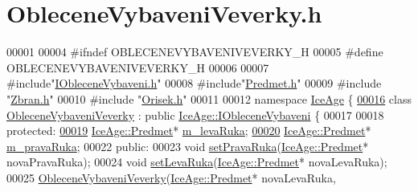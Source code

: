 \hypertarget{ObleceneVybaveniVeverky_8h_source}{}\section{Oblecene\+Vybaveni\+Veverky.\+h}
\label{ObleceneVybaveniVeverky_8h_source}

\begin{DoxyCode}
00001 
00004 \textcolor{preprocessor}{#ifndef OBLECENEVYBAVENIVEVERKY\_H}
00005 \textcolor{preprocessor}{#define OBLECENEVYBAVENIVEVERKY\_H}
00006 
00007 \textcolor{preprocessor}{#include"\hyperlink{IObleceneVybaveni_8h}{IObleceneVybaveni.h}"}
00008 \textcolor{preprocessor}{#include"\hyperlink{Predmet_8h}{Predmet.h}"}
00009 \textcolor{preprocessor}{#include "\hyperlink{Zbran_8h}{Zbran.h}"}
00010 \textcolor{preprocessor}{#include "\hyperlink{Orisek_8h}{Orisek.h}"}
00011 
00012 \textcolor{keyword}{namespace }\hyperlink{namespaceIceAge}{IceAge} \{
\hypertarget{ObleceneVybaveniVeverky_8h_source.tex_l00016}{}\hyperlink{classIceAge_1_1ObleceneVybaveniVeverky}{00016}     \textcolor{keyword}{class }\hyperlink{classIceAge_1_1ObleceneVybaveniVeverky}{ObleceneVybaveniVeverky} : \textcolor{keyword}{public} 
      \hyperlink{classIceAge_1_1IObleceneVybaveni}{IceAge::IObleceneVybaveni} \{
00017 
00018     \textcolor{keyword}{protected}:
\hypertarget{ObleceneVybaveniVeverky_8h_source.tex_l00019}{}\hyperlink{classIceAge_1_1ObleceneVybaveniVeverky_ad4e876f5b31bad5594470ee0c3588194}{00019}         \hyperlink{classIceAge_1_1Predmet}{IceAge::Predmet}* \hyperlink{classIceAge_1_1ObleceneVybaveniVeverky_ad4e876f5b31bad5594470ee0c3588194}{m\_levaRuka};
\hypertarget{ObleceneVybaveniVeverky_8h_source.tex_l00020}{}\hyperlink{classIceAge_1_1ObleceneVybaveniVeverky_a5cbec76ba9606fa634019e10f33f605c}{00020}         \hyperlink{classIceAge_1_1Predmet}{IceAge::Predmet}* \hyperlink{classIceAge_1_1ObleceneVybaveniVeverky_a5cbec76ba9606fa634019e10f33f605c}{m\_pravaRuka};
00022     \textcolor{keyword}{public}:
00023         \textcolor{keywordtype}{void} \hyperlink{classIceAge_1_1ObleceneVybaveniVeverky_a81c50b90cae451476735b88f3cdecb07}{setPravaRuka}(\hyperlink{classIceAge_1_1Predmet}{IceAge::Predmet}* novaPravaRuka);
00024         \textcolor{keywordtype}{void} \hyperlink{classIceAge_1_1ObleceneVybaveniVeverky_a2e4266a7941707c95f8ec2c41a7b97bb}{setLevaRuka}(\hyperlink{classIceAge_1_1Predmet}{IceAge::Predmet}* novaLevaRuka);
00025         \hyperlink{classIceAge_1_1ObleceneVybaveniVeverky_a54867f1ea6c86eb1cbbba398cd1d240c}{ObleceneVybaveniVeverky}(\hyperlink{classIceAge_1_1Predmet}{IceAge::Predmet}* novaLevaRuka, 

\end{DoxyCode}

